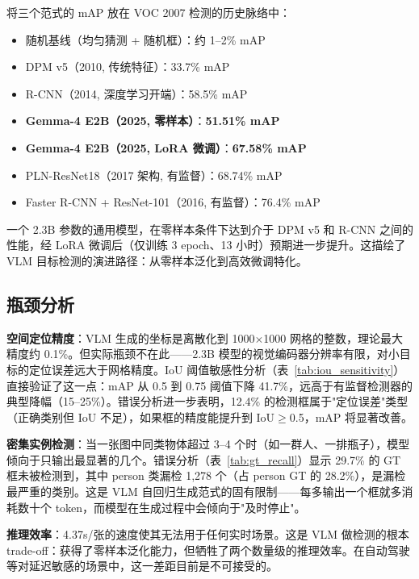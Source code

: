 \documentclass[12pt, a4paper]{article}
\begin{document}
将三个范式的 mAP 放在 VOC 2007 检测的历史脉络中：

\begin{itemize}
    \item 随机基线（均匀猜测 + 随机框）：约 1--2\% mAP
    \item DPM v5（2010, 传统特征）：33.7\% mAP
    \item R-CNN（2014, 深度学习开端）：58.5\% mAP
    \item \textbf{Gemma-4 E2B（2025, 零样本）}：\textbf{51.51\% mAP}
    \item \textbf{Gemma-4 E2B（2025, LoRA 微调）}：\textbf{67.58\% mAP}
    \item PLN-ResNet18（2017 架构, 有监督）：68.74\% mAP
    \item Faster R-CNN + ResNet-101（2016, 有监督）：76.4\% mAP
\end{itemize}

一个 2.3B 参数的通用模型，在零样本条件下达到介于 DPM v5 和 R-CNN 之间的性能，经 LoRA 微调后（仅训练 3 epoch、13 小时）预期进一步提升。这描绘了 VLM 目标检测的演进路径：从零样本泛化到高效微调特化。

\subsection{瓶颈分析}

\textbf{空间定位精度}：VLM 生成的坐标是离散化到 1000$\times$1000 网格的整数，理论最大精度约 0.1\%。但实际瓶颈不在此——2.3B 模型的视觉编码器分辨率有限，对小目标的定位误差远大于网格精度。IoU 阈值敏感性分析（表~\ref{tab:iou_sensitivity}）直接验证了这一点：mAP 从 0.5 到 0.75 阈值下降 41.7\%，远高于有监督检测器的典型降幅（15--25\%）。错误分析进一步表明，12.4\% 的检测框属于"定位误差"类型（正确类别但 IoU 不足），如果框的精度能提升到 IoU$\geq$0.5，mAP 将显著改善。

\textbf{密集实例检测}：当一张图中同类物体超过 3--4 个时（如一群人、一排瓶子），模型倾向于只输出最显著的几个。错误分析（表~\ref{tab:gt_recall}）显示 29.7\% 的 GT 框未被检测到，其中 person 类漏检 1,278 个（占 person GT 的 28.2\%），是漏检最严重的类别。这是 VLM 自回归生成范式的固有限制——每多输出一个框就多消耗数十个 token，而模型在生成过程中会倾向于"及时停止"。

\textbf{推理效率}：4.37s/张的速度使其无法用于任何实时场景。这是 VLM 做检测的根本 trade-off：获得了零样本泛化能力，但牺牲了两个数量级的推理效率。在自动驾驶等对延迟敏感的场景中，这一差距目前是不可接受的。

\end{document}
